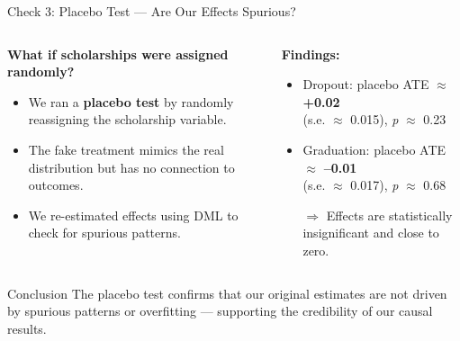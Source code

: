 \documentclass[aspectratio=169]{beamer}
\begin{document}
\begin{frame}{Check 3: Placebo Test — Are Our Effects Spurious?}
\vspace{-5pt}
\begin{columns}[t]
\begin{column}{0.5\textwidth}
\newline
\textbf{What if scholarships were assigned randomly?}
\begin{itemize}[label=--, itemsep=1pt]
    \item We ran a \textbf{placebo test} by randomly reassigning the scholarship variable.
    \item The fake treatment mimics the real distribution but has no connection to outcomes.
    \item We re-estimated effects using DML to check for spurious patterns.
\end{itemize}
\end{column}
\begin{column}{0.45\textwidth}
\newline
\textbf{Findings:}
\begin{itemize}[label=--, itemsep=1pt]
    \item Dropout: placebo ATE $\approx$ \textbf{+0.02} \\ (s.e. $\approx$ 0.015), \textit{p} $\approx$ 0.23
    \item Graduation: placebo ATE $\approx$ \textbf{–0.01} \\ (s.e. $\approx$ 0.017), \textit{p} $\approx$ 0.68
    \item [$\Rightarrow$] Effects are statistically insignificant and close to zero.
\end{itemize}
\end{column}
\end{columns}
\vspace{5pt}
\begin{block}{Conclusion}
The placebo test confirms that our original estimates are not driven by spurious patterns or overfitting — supporting the credibility of our causal results.
\end{block}
\end{frame}
\end{document}
